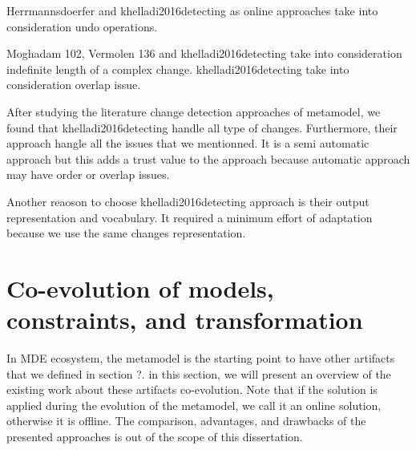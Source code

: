 Herrmannsdoerfer and khelladi2016detecting as online approaches take into consideration undo operations.


Moghadam 102, Vermolen 136 and khelladi2016detecting take into consideration indefinite length of a complex change.
khelladi2016detecting take into consideration overlap issue.




After studying the literature change detection approaches of metamodel, we found that khelladi2016detecting handle all type of changes. Furthermore, their approach hangle all the issues that we mentionned. 
It is a semi automatic approach but this adds a trust value to the approach because automatic approach may have order or overlap issues.

Another reaoson to choose khelladi2016detecting approach is their output representation and vocabulary. It required a minimum effort of adaptation because we use the same changes representation.

 \section{Co-evolution of models, constraints, and transformation}
 \label{coevolutionartifacts}
 In MDE ecosystem, the metamodel is the starting point to have other artifacts that we defined in section ?. in this section, we will present an overview of the existing work about these artifacts co-evolution. Note that if the solution is applied during the evolution of the metamodel, we call it an online solution, otherwise it is offline.
 The comparison, advantages, and drawbacks of the presented approaches is out of the scope of this dissertation.
 
